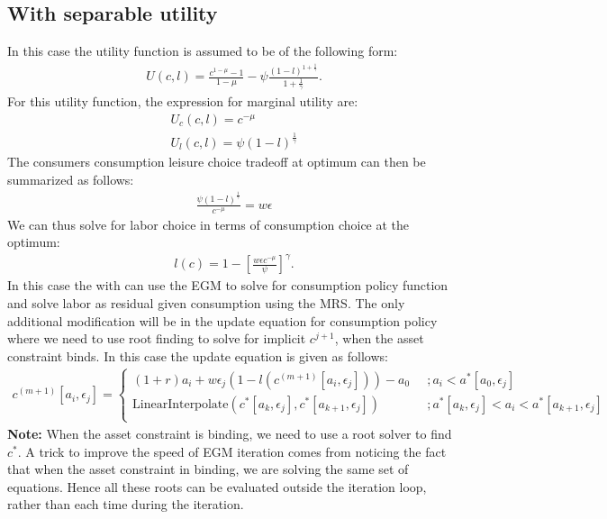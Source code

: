 \documentclass[12pt]{article}
\begin{document}
\subsection{With separable utility}
In this case the utility function is assumed to be of the following form:
\begin{align*}
U(c, l) = \frac{c^{1-\mu} -1}{1-\mu} - \psi \frac{(1-l)^{1+\frac{1}{\gamma}}}{1+ \frac{1}{\gamma}}.
\end{align*}
For this utility function, the expression for marginal utility are:
\begin{align*}
U_c(c, l) = c^{-\mu} \\
U_l(c, l) = \psi (1-l)^{\frac{1}{\gamma}}
\end{align*}
The consumers consumption leisure choice tradeoff at optimum can then be summarized as follows:
\begin{align*}
\frac{\psi(1-l)^{\frac{1}{\gamma}}}{c^{-\mu}}  = w\epsilon 
\end{align*}
We can thus solve for labor choice in terms of consumption choice at the optimum:
\begin{align*}
l(c) = 1- [\frac{w \epsilon c^{-\mu}}{\psi}]^{\gamma}.
\end{align*}
In this case the with can use the EGM to solve for consumption policy function and solve labor as residual given consumption using the MRS. The only additional modification will be in the update equation for consumption policy where we need to use root finding to solve for implicit $c^{j+1}$, when the asset constraint binds.  In this case the update equation is given as follows:
\begin{align*}
c^{(m+1)}[a_i, \epsilon_j]= 
\begin{cases}
(1+r)a_i + w\epsilon_j(1-l(c^{(m+1)}[a_i, \epsilon_j])) - a_0 & \; \; ;  a_i < a^*[a_0, \epsilon_j] \\
\text{LinearInterpolate} (c^*[a_k, \epsilon_j], c^*[a_{k+1}, \epsilon_j])  & \; \; ; a^*[a_k, \epsilon_j] < a_i < a^*[a_{k+1}, \epsilon_j] \\
\end{cases}
\end{align*}
\textbf{Note:} When the asset constraint is binding, we need to use a root solver to find $c^*$. A trick to improve the speed of EGM iteration comes from noticing the fact that when the asset constraint in binding, we are solving the same set of equations. Hence all these roots can be evaluated outside the iteration loop, rather than each time during the iteration.
\end{document}
